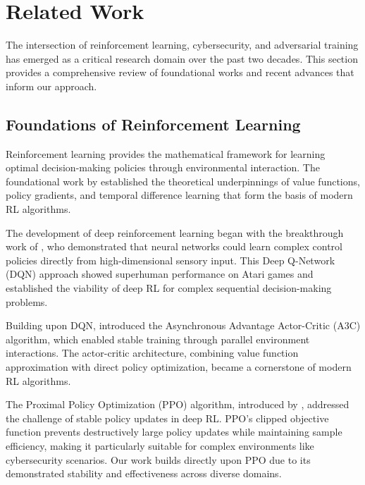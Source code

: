 
\section{Related Work}

The intersection of reinforcement learning, cybersecurity, and adversarial training has emerged as a critical research domain over the past two decades. This section provides a comprehensive review of foundational works and recent advances that inform our approach.

\subsection{Foundations of Reinforcement Learning}

Reinforcement learning provides the mathematical framework for learning optimal decision-making policies through environmental interaction. The foundational work by \citet{sutton2018reinforcement} established the theoretical underpinnings of value functions, policy gradients, and temporal difference learning that form the basis of modern RL algorithms.

The development of deep reinforcement learning began with the breakthrough work of \citet{mnih2015human}, who demonstrated that neural networks could learn complex control policies directly from high-dimensional sensory input. This Deep Q-Network (DQN) approach showed superhuman performance on Atari games and established the viability of deep RL for complex sequential decision-making problems.

Building upon DQN, \citet{mnih2016asynchronous} introduced the Asynchronous Advantage Actor-Critic (A3C) algorithm, which enabled stable training through parallel environment interactions. The actor-critic architecture, combining value function approximation with direct policy optimization, became a cornerstone of modern RL algorithms.

The Proximal Policy Optimization (PPO) algorithm, introduced by \citet{schulman2017proximal}, addressed the challenge of stable policy updates in deep RL. PPO's clipped objective function prevents destructively large policy updates while maintaining sample efficiency, making it particularly suitable for complex environments like cybersecurity scenarios. Our work builds directly upon PPO due to its demonstrated stability and effectiveness across diverse domains.

